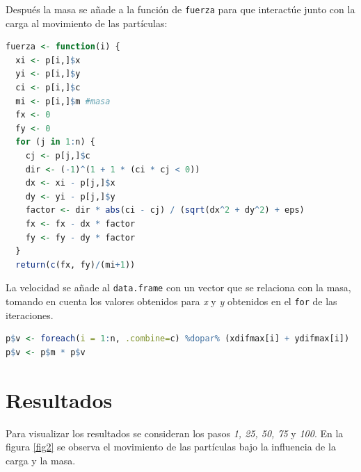 \documentclass{article}
\begin{document}
\newpage
Después la masa se añade a la función de \texttt{fuerza} para que interactúe junto con la carga al movimiento de las partículas:
\begin{lstlisting}[language=R]
fuerza <- function(i) {
  xi <- p[i,]$x
  yi <- p[i,]$y
  ci <- p[i,]$c
  mi <- p[i,]$m #masa
  fx <- 0
  fy <- 0
  for (j in 1:n) {
    cj <- p[j,]$c
    dir <- (-1)^(1 + 1 * (ci * cj < 0))
    dx <- xi - p[j,]$x
    dy <- yi - p[j,]$y
    factor <- dir * abs(ci - cj) / (sqrt(dx^2 + dy^2) + eps)
    fx <- fx - dx * factor
    fy <- fy - dy * factor
  }
  return(c(fx, fy)/(mi+1))
\end{lstlisting}

La velocidad se añade al \texttt{data.frame} con un vector que se relaciona con la masa, tomando en cuenta los valores obtenidos para \textit{x} y \textit{y} obtenidos en el \texttt{for} de las iteraciones.
\begin{lstlisting}[language=R]
p$v <- foreach(i = 1:n, .combine=c) %dopar% (xdifmax[i] + ydifmax[i])
p$v <- p$m * p$v
\end{lstlisting}
\newpage


\section{Resultados}
Para visualizar los resultados se consideran los pasos \textit{1, 25, 50, 75} y \textit{100}. En la figura \ref{fig2} se observa el movimiento de las partículas bajo la influencia de la carga y la masa.
\end{document}

